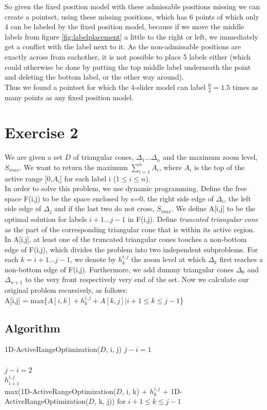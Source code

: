 \documentclass[a4paper,11pt]{article}
\begin{document}
So given the fixed position model with these admissable positions missing we can create a pointset, using these missing positions, which has 6 points of which only 4 can be labeled by the fixed position model, because if we move the middle labels from figure \ref{fig:labelplacement} a little to the right or left, we immediately get a conflict with the label next to it. As the non-admissable positions are exactly across from eachother, it is not possible to place 5 labels either (which could otherwise be done by putting the top middle label underneath the point and deleting the bottom label, or the other way around).\\

Thus we found a pointset for which the 4-slider model can label $\frac{6}{4} = 1.5$ times as many points as any fixed position model.


\section*{Exercise 2}
We are given a set $D$ of triangular cones, $\Delta_1 \dots \Delta_n$ and the maximum zoom level, $S_{max}$. We want to return the maximum $\sum_{i=1}^{n}A_i$, where $A_i$ is the top of the active range [0,$A_i$] for each label i ($1 \leq i \leq n$).\\
In order to solve this problem, we use dynamic programming. Define the free space F(i,j) to be the space enclosed by s=0, the right side edge of $\Delta_i$, the left side edge of $\Delta_j$ and if the last two do not cross, $S_{max}$. We define A[i,j] to be the optimal solution for labels $i+1 \dots j-1$ in F(i,j). Define \textit{truncated triangular cone} as the part of the corresponding triangular cone that is within its active region. In A[i,j], at least one of the truncated triangular cones touches a non-bottom edge of F(i,j), which divides the problem into two independent subproblems. For each $k = i+1 \dots j-1$, we denote by $h_{k}^{i,j}$ the zoom level at which $\Delta_k$ first reaches a non-bottom edge of F(i,j). Furthermore, we add dummy triangular cones $\Delta_0$ and $\Delta_{n+1}$ to the very front respectively very end of the set. Now we calculate our original problem recursively, as follows:\\
A[i,j] = max\{$A[i,k] + h_{k}^{i,j} + A[k,j] | i+1 \leq k \leq j-1$\}\\

\subsection*{Algorithm}
\begin{algorithm}{1D-ActiveRangeOptimization}{($D$, i, j)}
	\qif $j-i = 1$\\
	\qthen {}\\
	\qelse \qif $j-i = 2$\\
	\qthen \qreturn $h_{i+1}^{i,j}$\qend \qend \qend \\ 
	\qreturn max(1D-ActiveRangeOptimization($D$, i, k) + $h_{k}^{i,j}$ + 1D-ActiveRangeOptimization($D$, k, j)) for $i + 1 \leq k \leq j-1$
\end{algorithm} 
\end{document}
